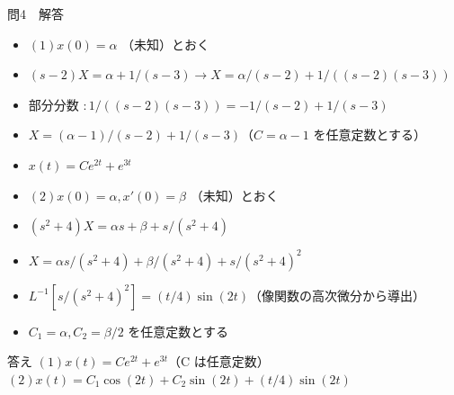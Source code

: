 \documentclass[aspectratio=43,professionalfonts,handout]{beamer}
\begin{document}
\begin{frame}{問4　解答}
  \begin{block}{}
  \begin{itemize}\setlength{\itemsep}{2pt}
    \item $(1) x(0) = \alpha$ （未知）とおく
    \item $    (s-2)X = \alpha + 1/(s-3)   \to   X = \alpha/(s-2) + 1/((s-2)(s-3))$
    \item 部分分数 $: 1/((s-2)(s-3)) = -1/(s-2) + 1/(s-3)$
    \item $X = (\alpha-1)/(s-2) + 1/(s-3)$（$C = \alpha-1$ を任意定数とする）
    \item $    x(t) = Ce^{2t} + e^{3t}$
    \item $(2) x(0)=\alpha, x'(0)=\beta$ （未知）とおく
    \item $    (s^{2}+4)X = \alpha s + \beta + s/(s^{2}+4)$
    \item $    X = \alpha s/(s^{2}+4) + \beta/(s^{2}+4) + s/(s^{2}+4)^{2}$
    \item $L^{-1}[s/(s^{2}+4)^{2}] = (t/4)\sin(2t)$（像関数の高次微分から導出）
    \item $C_{1} = \alpha, C_{2} = \beta/2$ を任意定数とする
  \end{itemize}
  \end{block}
  \begin{exampleblock}{答え}
  $(1) x(t) = Ce^{2t} + e^{3t}$（C は任意定数）\\
  $(2) x(t) = C_{1}\cos(2t) + C_{2}\sin(2t) + (t/4)\sin(2t)$\\
  \end{exampleblock}
\end{frame}
\end{document}
